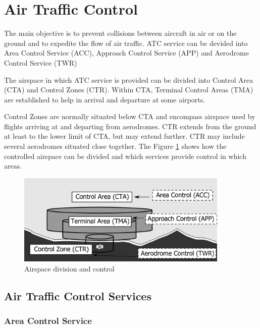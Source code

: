 
\section{Air Traffic Control}

The main objective is to prevent collisions between aircraft in air or on the ground and to expedite the flow of air traffic. \cite[Chapter 2.2]{annex11} ATC service can be devided into Area Control Service (ACC), Approach Control Service (APP) and Aerodrome Control Service (TWR) \cite[Chapter 1]{doc4444} 

The airspace in which ATC service is provided can be divided into Control Area (CTA) and Control Zones (CTR). Within CTA, Terminal Control Areas (TMA) are established to help in arrival and departure at some airports.

Control Zones are normally situated below CTA and encompass airspace used by flights arriving at and departing from aerodromes. CTR extends from the ground at least to the lower limit of CTA, but may extend further. CTR may include several aerodromes situated close together. \cite[Chapter 2.10]{annex11} The Figure \ref{fig:airspace} shows how the controlled airspace can be divided and which services provide control in which areas.

\begin{figure}[h]
    \centering
    \includegraphics[width=0.9\textwidth]{figures/airspace.png}
    \caption{Airspace division and control \cite[Chapter 2.10]{annex11}}
    \label{fig:airspace}
\end{figure}

\subsection{Air Traffic Control Services}
\subsubsection{Area Control Service}
